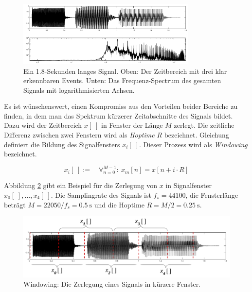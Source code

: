 \begin{figure}[h]
	\centering
	\includegraphics[width=0.8\textwidth]{bilder/stft01.png}
	\caption{Ein 1.8-Sekunden langes Signal. Oben: Der Zeitbereich mit drei klar erkennbaren Events. Unten: Das Frequenz-Spectrum des gesamten Signals mit logarithmisierten Achsen.}
	\label{img:stft01}
\end{figure}

Es ist wünschenswert, einen Kompromiss aus den Vorteilen beider Bereiche zu finden, in dem man das Spektrum kürzerer Zeitabschnitte des Signals bildet. Dazu wird der Zeitbereich $x[\;]$ in Fenster der Länge $M$ zerlegt. Die zeitliche Differenz zwischen zwei Fenstern wird als \emph{Hoptime} $R$ bezeichnet. Gleichung definiert die Bildung des Signalfensters $x_i[\;]$. Dieser Prozess wird als \emph{Windowing} bezeichnet.\cite{juliusSmith}

\begin{equation}
x_i[\;] := \quad \mathop{\forall}_{n = 0}^{M-1} :\ x_{m}[n] = x[n+i\cdot R]
\label{eq:signal-Window}
\end{equation}

Abbildung \ref{img:siganlWindows} gibt ein Beispiel für die Zerlegung von $x$ in Signalfenster $x_0[\;] ,\ldots, x_4[\;]$. Die Samplingrate des Signals ist $f_s = 44100$, die Fensterlänge beträgt $M = 22050 / f_s = \SI{0.5}{\second}$ und die Hoptime $R = M / 2= \SI{0.25}{\second}$.

\begin{figure}[h]
	\centering
	\includegraphics[width=1\textwidth]{bilder/signalWindows02.png}
	\caption{Windowing: Die Zerlegung eines Signals in kürzere Fenster.}
	\label{img:siganlWindows}
\end{figure}

